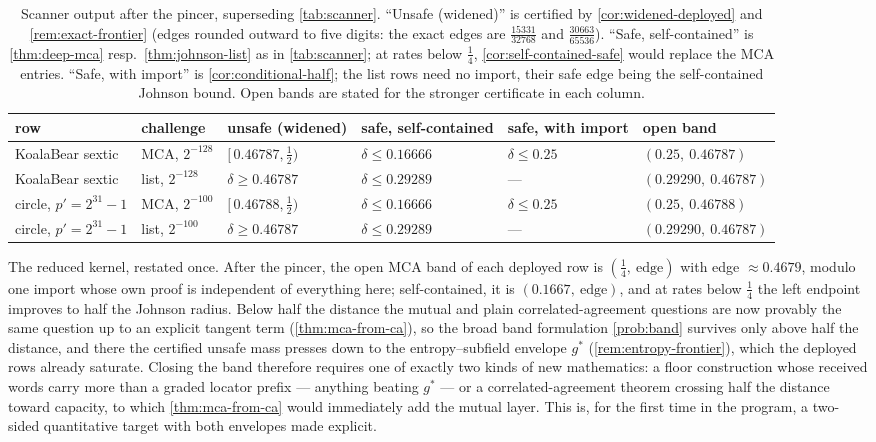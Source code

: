 \documentclass[11pt]{article}
\theoremstyle{definition}
\theoremstyle{remark}
\begin{document}
\begin{table}[t]
\centering\footnotesize
\setlength{\tabcolsep}{4pt}
\begin{tabular}{@{}llllll@{}}
\toprule
row & challenge & unsafe \textup{(widened)} & safe, self-contained & safe, with import & open band \\
\midrule
KoalaBear sextic & MCA, $2^{-128}$ & $[\,0.46787,\tfrac12)$ & $\delta\le0.16666$ & $\delta\le0.25$ & $(0.25,\ 0.46787)$ \\
KoalaBear sextic & list, $2^{-128}$ & $\delta\ge0.46787$ & $\delta\le0.29289$ & --- & $(0.29290,\ 0.46787)$ \\
circle, $p'{=}2^{31}{-}1$ & MCA, $2^{-100}$ & $[\,0.46788,\tfrac12)$ & $\delta\le0.16666$ & $\delta\le0.25$ & $(0.25,\ 0.46788)$ \\
circle, $p'{=}2^{31}{-}1$ & list, $2^{-100}$ & $\delta\ge0.46787$ & $\delta\le0.29289$ & --- & $(0.29290,\ 0.46787)$ \\
\bottomrule
\end{tabular}
\caption{Scanner output after the pincer, superseding \cref{tab:scanner}. ``Unsafe (widened)'' is certified by \cref{cor:widened-deployed} and \cref{rem:exact-frontier} (edges rounded outward to five digits: the exact edges are $\tfrac{15331}{32768}$ and $\tfrac{30663}{65536}$). ``Safe, self-contained'' is \cref{thm:deep-mca} resp.\ \cref{thm:johnson-list} as in \cref{tab:scanner}; at rates below $\tfrac14$, \cref{cor:self-contained-safe} would replace the MCA entries. ``Safe, with import'' is \cref{cor:conditional-half}; the list rows need no import, their safe edge being the self-contained Johnson bound. Open bands are stated for the stronger certificate in each column.}
\label{tab:scanner2}
\end{table}

The reduced kernel, restated once. After the pincer, the open MCA band of each deployed row is $(\tfrac14,\ \text{edge})$ with edge $\approx0.4679$, modulo one import whose own proof is independent of everything here; self-contained, it is $(0.1667,\ \text{edge})$, and at rates below $\tfrac14$ the left endpoint improves to half the Johnson radius. Below half the distance the mutual and plain correlated-agreement questions are now provably the same question up to an explicit tangent term (\cref{thm:mca-from-ca}), so the broad band formulation \cref{prob:band} survives only above half the distance, and there the certified unsafe mass presses down to the entropy--subfield envelope $g^*$ (\cref{rem:entropy-frontier}), which the deployed rows already saturate. Closing the band therefore requires one of exactly two kinds of new mathematics: a floor construction whose received words carry more than a graded locator prefix --- anything beating $g^*$ --- or a correlated-agreement theorem crossing half the distance toward capacity, to which \cref{thm:mca-from-ca} would immediately add the mutual layer. This is, for the first time in the program, a two-sided quantitative target with both envelopes made explicit.
\end{document}
